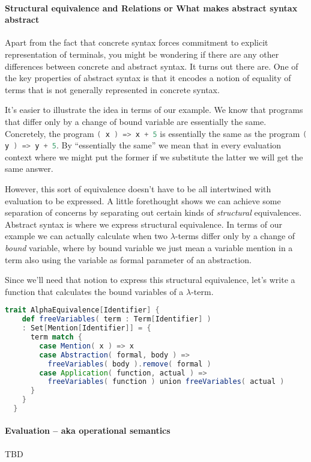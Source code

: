 \paragraph{Structural equivalence and Relations or What makes abstract syntax abstract}

Apart from the fact that concrete syntax forces commitment to explicit
representation of terminals, you might be wondering if there are any
other differences between concrete and abstract syntax. It turns out
there are. One of the key properties of abstract syntax is that it
encodes a notion of equality of terms that is not generally
represented in concrete syntax.

It's easier to illustrate the idea in terms of our example. We know
that programs that differ only by a change of bound variable are
essentially the same. Concretely, the program
\lstinline[language=Scala]!( x ) => x + 5! is essentially the same as
the program \lstinline[language=Scala]!( y ) => y + 5!. By
``essentially the same'' we mean that in every evaluation context
where we might put the former if we substitute the latter we will get
the same answer. 

However, this sort of equivalence doesn't have to be all intertwined
with evaluation to be expressed. A little forethought shows we can
achieve some separation of concerns by separating out certain kinds of
\emph{structural} equivalences. Abstract syntax is where we express
structural equivalence. In terms of our example we can actually
calculate when two $\lambda$-terms differ only by a change of
\emph{bound} variable, where by bound variable we just mean a variable
mention in a term also using the variable as formal parameter of an
abstraction. 

Since we'll need that notion to express this structural equivalence,
let's write a function that calculates the bound variables of a
$\lambda$-term.

\begin{lstlisting}[language=Scala]
  trait AlphaEquivalence[Identifier] {
    def freeVariables( term : Term[Identifier] )
    : Set[Mention[Identifier]] = {
      term match {
        case Mention( x ) => x
        case Abstraction( formal, body ) =>
          freeVariables( body ).remove( formal )
        case Application( function, actual ) =>
          freeVariables( function ) union freeVariables( actual )
      }
    }
  }
\end{lstlisting}

\paragraph{Evaluation -- aka operational semantics}

TBD